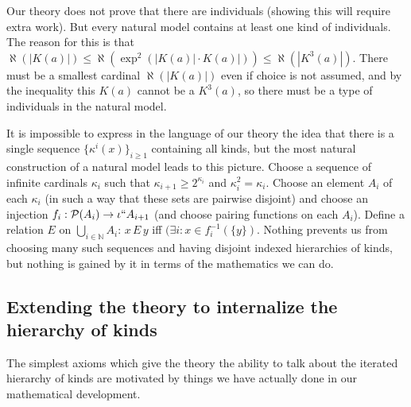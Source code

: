 \documentclass[12pt]{article}
\begin{document}
Our theory does not prove that there are individuals (showing this will require extra work).  But every natural model contains at least one kind of individuals.  The reason for this is that $\aleph(|K(a)|) \leq \aleph(\exp^2(|K(a)|\cdot K(a)|)) \leq \aleph(|K^3(a)|)$.  There must be a smallest cardinal $\aleph(|K(a)|)$ even if choice is not assumed, and by the inequality
this $K(a)$ cannot be a $K^3(a)$, so there must be a type of individuals in the natural model.

It is impossible to express in the language of our theory the idea that there is a single sequence $\{\kappa^i(x)\}_{i \geq 1}$ containing all kinds, but the most natural construction of a natural model leads to this picture.  Choose a sequence of infinite cardinals $\kappa_i$ such that $\kappa_{i+1} \geq 2^{\kappa_i}$ and $\kappa_i^2=\kappa_i$.  Choose an element $A_i$ of each $\kappa_i$ (in such a way that these sets are pairwise disjoint) and choose an injection $f_i:{\cal P}(A_i) \rightarrow \iota``A_{i+1}$ (and choose pairing functions on each $A_i$).  Define a relation $E$ on $\bigcup_{i \in \mathbb N}A_i$:  $x \,E\,y$ iff $(\exists i:x \in f_{i}^{-1}(\{y\})$.   Nothing prevents us from choosing many such sequences and having disjoint indexed hierarchies of kinds, but nothing is gained by it in terms of the mathematics we can do.

\subsection{Extending the theory to internalize the hierarchy of kinds}

The simplest axioms which give the theory the ability to talk about the iterated hierarchy of kinds are motivated by things we have actually done in our mathematical development.
\end{document}
